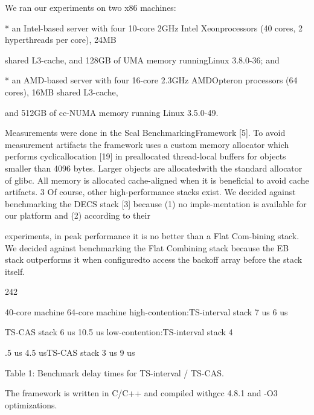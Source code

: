We ran our experiments on two x86 machines:

* an Intel-based server with four 10-core 2GHz Intel Xeonprocessors (40 cores, 2 hyperthreads per core), 24MB

shared L3-cache, and 128GB of UMA memory runningLinux 3.8.0-36; and

* an AMD-based server with four 16-core 2.3GHz AMDOpteron processors (64 cores), 16MB shared L3-cache,

and 512GB of cc-NUMA memory running Linux 3.5.0-49.

Measurements were done in the Scal BenchmarkingFramework [5]. To avoid measurement artifacts the framework uses a custom memory allocator which performs cyclicallocation [19] in preallocated thread-local buffers for objects smaller than 4096 bytes. Larger objects are allocatedwith the standard allocator of glibc. All memory is allocated
cache-aligned when it is beneficial to avoid cache artifacts.
3 Of course, other high-performance stacks exist. We decided
against benchmarking the DECS stack [3] because (1) no imple-mentation is available for our platform and (2) according to their

experiments, in peak performance it is no better than a Flat Com-bining stack. We decided against benchmarking the Flat Combining stack because the EB stack outperforms it when configuredto access the backoff array before the stack itself.

242

40-core machine 64-core machine
high-contention:TS-interval stack 7 us 6 us

TS-CAS stack 6 us 10.5 us
low-contention:TS-interval stack 4

.5 us 4.5 usTS-CAS stack 3 us 9 us

Table 1: Benchmark delay times for TS-interval / TS-CAS.

The framework is written in C/C++ and compiled withgcc 4.8.1 and -O3 optimizations.

